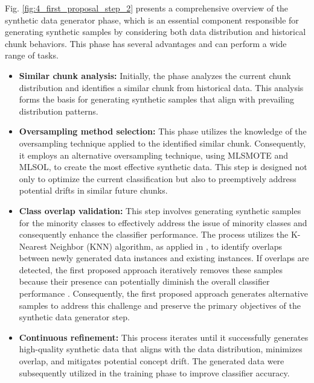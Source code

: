 Fig. \ref{fig:4_first_proposal_step_2} presents a comprehensive overview of the synthetic data generator phase, which is an essential component responsible for generating synthetic samples by considering both data distribution and historical chunk behaviors. This phase has several advantages and can perform a wide range of tasks.
\begin{itemize}
	\item \textbf{Similar chunk analysis:} Initially, the phase analyzes the current chunk distribution and identifies a similar chunk from historical data. This analysis forms the basis for generating synthetic samples that align with prevailing distribution patterns.
	\item \textbf{Oversampling method selection:} This phase utilizes the knowledge of the oversampling technique applied to the identified similar chunk. Consequently, it employs an alternative oversampling technique, using MLSMOTE and MLSOL, to create the most effective synthetic data. This step is designed not only to optimize the current classification but also to preemptively address potential drifts in similar future chunks.
	\item \textbf{Class overlap validation:} This step involves generating synthetic samples for the minority classes to effectively address the issue of minority classes and consequently enhance the classifier performance. The process utilizes the K-Nearest Neighbor (KNN) algorithm, as applied in \cite{lu2016concept}, to identify overlaps between newly generated data instances and existing instances. If overlaps are detected, the first proposed approach iteratively removes these samples because their presence can potentially diminish the overall classifier performance \cite{cruz2017meta, widmer1996learning}. Consequently, the first proposed approach generates alternative samples to address this challenge and preserve the primary objectives of the synthetic data generator step.
	\item \textbf{Continuous refinement:} This process iterates until it successfully generates high-quality synthetic data that aligns with the data distribution, minimizes overlap, and mitigates potential concept drift. The generated data were subsequently utilized in the training phase to improve classifier accuracy.
\end{itemize}

